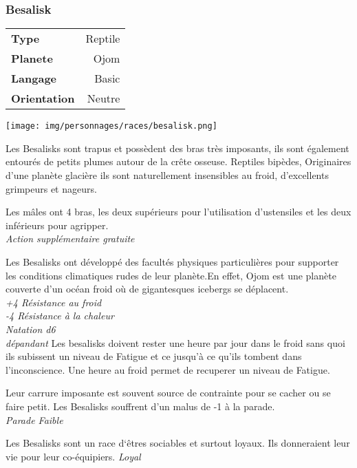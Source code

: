 \subsubsection{Besalisk}
\vspace{-2\baselineskip}
\begin{flushright}	
    \begin{tabular}{|l|r|}
        \textbf{Type} & Reptile \\
        \textbf{Planete} & Ojom \\
        \textbf{Langage} & Basic \\
        \textbf{Orientation} & Neutre\\
    \end{tabular}
\end{flushright}
\vspace{-3\baselineskip}
\texttt{[image: img/personnages/races/besalisk.png]}
 
Les Besalisks sont trapus et possèdent des bras très imposants, ils sont également entourés de petits plumes autour de la crête osseuse. Reptiles bipèdes, Originaires d’une planète glacière ils sont naturellement insensibles au froid, d’excellents grimpeurs et nageurs. 

\begin{description}[align=left]
\item [A bras le corps]         %
    Les mâles ont 4 bras, les deux supérieurs pour l’utilisation d’ustensiles et les deux inférieurs pour agripper.\\
    \emph{Action supplémentaire gratuite} 

\item [Grandir sur un iceberg]             %
    Les Besalisks ont développé des facultés physiques particulières pour supporter les conditions climatiques rudes de leur planète.En effet, Ojom est une planète couverte d'un océan froid où de gigantesques icebergs se déplacent.\\
    \emph{+4 Résistance au froid}\\
    \emph{-4 Résistance à la chaleur}\\
    \emph{Natation d6}\\
    \emph{dépandant} Les besalisks doivent rester une heure par jour dans le froid sans quoi ils subissent un niveau de Fatigue et ce jusqu'à ce qu'ils tombent dans l'inconscience. Une heure au froid permet de recuperer un niveau de Fatigue.

\item [Imposant] %
	Leur carrure imposante est souvent source de contrainte pour se cacher ou se faire petit. Les Besalisks souffrent d'un malus de -1 à la parade.\\
	\emph{Parade Faible}
    
\item [Loyal]                   %
    Les Besalisks sont un race d‘êtres sociables et surtout loyaux. Ils donneraient leur vie pour leur co-équipiers.
    \emph{Loyal}
\end{description}
